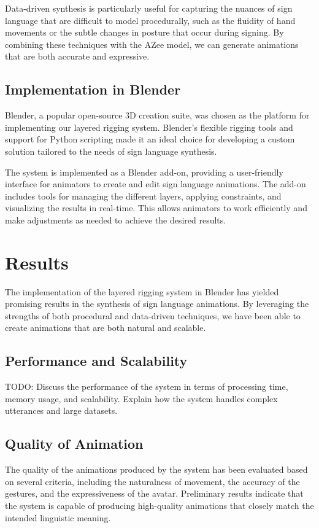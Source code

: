 \documentclass[../../main.tex]{subfiles}
\begin{document}
Data-driven synthesis is particularly useful for capturing the nuances of sign language that are difficult to model procedurally, such as the fluidity of hand movements or the subtle changes in posture that occur during signing. By combining these techniques with the AZee model, we can generate animations that are both accurate and expressive.

\subsection{Implementation in Blender}
Blender, a popular open-source 3D creation suite, was chosen as the platform for implementing our layered rigging system. Blender's flexible rigging tools and support for Python scripting made it an ideal choice for developing a custom solution tailored to the needs of sign language synthesis.

The system is implemented as a Blender add-on, providing a user-friendly interface for animators to create and edit sign language animations. The add-on includes tools for managing the different layers, applying constraints, and visualizing the results in real-time. This allows animators to work efficiently and make adjustments as needed to achieve the desired results.

\section{Results}
The implementation of the layered rigging system in Blender has yielded promising results in the synthesis of sign language animations. By leveraging the strengths of both procedural and data-driven techniques, we have been able to create animations that are both natural and scalable.

\subsection{Performance and Scalability}
TODO: Discuss the performance of the system in terms of processing time, memory usage, and scalability. Explain how the system handles complex utterances and large datasets.

\subsection{Quality of Animation}
The quality of the animations produced by the system has been evaluated based on several criteria, including the naturalness of movement, the accuracy of the gestures, and the expressiveness of the avatar. Preliminary results indicate that the system is capable of producing high-quality animations that closely match the intended linguistic meaning.
\end{document}
